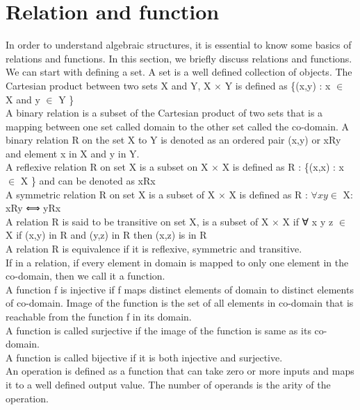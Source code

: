 \section{Relation and function}
In order to understand algebraic structures, it is essential to know some basics of relations and functions. In this section, we briefly discuss relations and functions. We can start with defining a set. A set is a well defined collection of objects. The Cartesian product between two sets X and Y,  X \(\times\) Y is defined as \{(x,y) : x \(\in\) X and y \(\in\) Y \} \\
A binary relation is a subset of the Cartesian product of two sets that is a mapping between one set called domain to the other set called the co-domain. A binary relation R on the set X to Y is denoted as an ordered pair (x,y) or xRy and element x in X and y in Y. \\
A reflexive relation R on set X is a subset on X \(\times\) X is defined as R : \{(x,x) : x \(\in\) X \} and can be denoted as xRx \\
A symmetric relation R on set X is a subset of X \(\times\) X is defined as R : \(\forall x y \in \) X: xRy ⟺ yRx \\
A relation R is said to be transitive on set X, is a subset of X \(\times\) X if ∀ x y z  \(\in\) X if (x,y) in R and (y,z) in R then (x,z) is in R\\
A relation R is equivalence if it is reflexive, symmetric and transitive. \\
If in a relation, if every element in domain is mapped to only one element in the co-domain, then we call it a function.\\
A function f is injective if f maps distinct elements of domain to distinct elements of co-domain.
Image of the function is the set of all elements in co-domain that is reachable from the function f in its domain.\\
A function is called surjective if the image of the function is same as its co-domain.\\
A function is called bijective if it is both injective and surjective.\\
An operation is defined as a function that can take zero or more inputs and maps it to a well defined output value. The number of operands is the arity of the operation.


